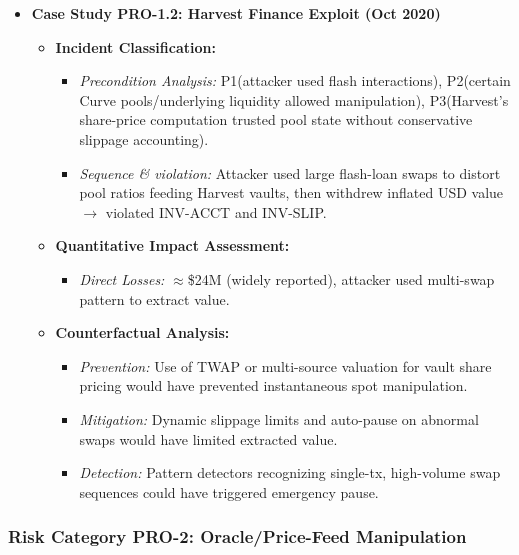 \begin{itemize}
\begin{itemize}
\begin{itemize}
            \end{itemize}
    \end{itemize}
        \item \textbf{Case Study PRO-1.2: Harvest Finance Exploit (Oct 2020)}
    \begin{itemize}
        \item \textbf{Incident Classification:}
            \begin{itemize}
                \item \textit{Precondition Analysis:} P1\checkmark (attacker used flash interactions), P2\checkmark (certain Curve pools/underlying liquidity allowed manipulation), P3\checkmark (Harvest's share-price computation trusted pool state without conservative slippage accounting).
                \item \textit{Sequence \& violation:} Attacker used large flash-loan swaps to distort pool ratios feeding Harvest vaults, then withdrew inflated USD value $\rightarrow$ violated INV-ACCT and INV-SLIP.
            \end{itemize}
        \item \textbf{Quantitative Impact Assessment:}
            \begin{itemize}
                \item \textit{Direct Losses:} $\approx$\$24M (widely reported), attacker used multi-swap pattern to extract value.
            \end{itemize}
        \item \textbf{Counterfactual Analysis:}
            \begin{itemize}
                \item \textit{Prevention:} Use of TWAP or multi-source valuation for vault share pricing would have prevented instantaneous spot manipulation.
                \item \textit{Mitigation:} Dynamic slippage limits and auto-pause on abnormal swaps would have limited extracted value.
                \item \textit{Detection:} Pattern detectors recognizing single-tx, high-volume swap sequences could have triggered emergency pause.
            \end{itemize}
    \end{itemize}
\end{itemize}


\subsubsection{Risk Category PRO-2: Oracle/Price-Feed Manipulation}


